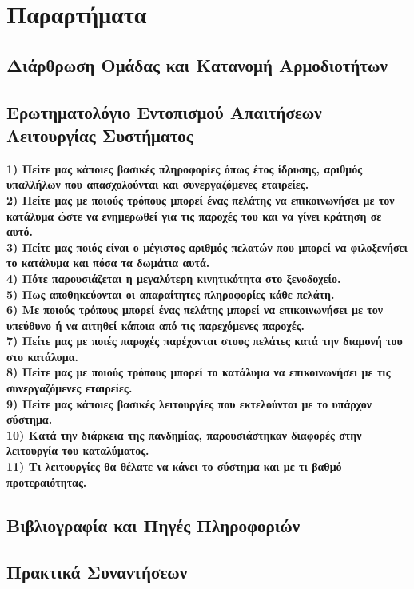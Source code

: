 \chapter{Παραρτήματα}
		
\section{Διάρθρωση Ομάδας και Κατανομή Αρμοδιοτήτων}
\section{Ερωτηματολόγιο Εντοπισμού Απαιτήσεων Λειτουργίας Συστήματος}
\textbf{1) Πείτε μας κάποιες βασικές πληροφορίες όπως έτος ίδρυσης, αριθμός 
	υπαλλήλων που απασχολούνται και συνεργαζόμενες εταιρείες.} \\

\noindent
\textbf{2) Πείτε μας με ποιούς τρόπους μπορεί ένας πελάτης να επικοινωνήσει
	με τον κατάλυμα ώστε να ενημερωθεί για τις παροχές του και να γίνει κράτηση
	σε αυτό.} \\

\noindent
\textbf{3) Πείτε μας ποιός είναι ο μέγιστος αριθμός πελατών που μπορεί να φιλοξενήσει 
	το κατάλυμα και πόσα τα δωμάτια αυτά.} \\

\noindent
\textbf{4) Πότε παρουσιάζεται η μεγαλύτερη κινητικότητα στο ξενοδοχείο.} \\ 

\noindent
\textbf{5) Πως αποθηκεύονται οι απαραίτητες πληροφορίες κάθε πελάτη.} \\

\noindent
\textbf{6) Με ποιούς τρόπους μπορεί ένας πελάτης μπορεί  να επικοινωνήσει 
	με τον υπεύθυνο ή να αιτηθεί κάποια από τις παρεχόμενες παροχές.} \\

\noindent
\textbf{7) Πείτε μας με ποιές παροχές παρέχονται στους πελάτες κατά την διαμονή 
	του στο κατάλυμα.} \\

\noindent
\textbf{8) Πείτε μας με ποιούς τρόπους μπορεί το κατάλυμα να επικοινωνήσει με τις 
	συνεργαζόμενες εταιρείες.} \\

\noindent
\textbf{9) Πείτε μας κάποιες βασικές λειτουργίες που εκτελούνται με το υπάρχον 
	σύστημα.} \\

\noindent
\textbf{10) Κατά την διάρκεια της πανδημίας, παρουσιάστηκαν διαφορές στην
	λειτουργία του καταλύματος.} \\

\noindent
\textbf{11) Τι λειτουργίες θα θέλατε να κάνει το σύστημα και με τι βαθμό 
	προτεραιότητας.} \\


\section{Βιβλιογραφία και Πηγές Πληροφοριών}
\section{Πρακτικά Συναντήσεων}